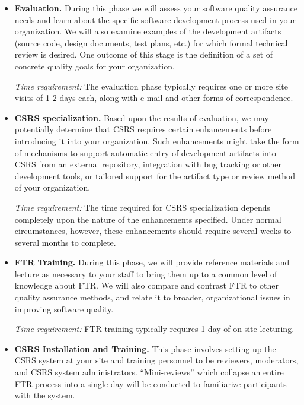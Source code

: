 \begin{itemize}
  
\item {\bf Evaluation.} During this phase we will assess your software
  quality assurance needs and learn about the specific software development
  process used in your organization.  We will also examine examples of the
  development artifacts (source code, design documents, test plans, etc.)
  for which formal technical review is desired.  One outcome of this stage is
  the definition of a set of concrete quality goals for your organization.
  
  {\em Time requirement:} The evaluation phase typically requires one or more
  site visits of 1-2 days each, along with e-mail and other forms of
  correspondence.
  
\item {\bf CSRS specialization.} Based upon the results of evaluation, we
  may potentially determine that CSRS requires certain enhancements before
  introducing it into your organization.  Such enhancements might take the
  form of mechanisms to support automatic entry of development artifacts into
  CSRS from an external repository, integration with bug tracking or other
  development tools, or tailored support for the artifact type or review
  method of your organization.
  
  {\em Time requirement:} The time required for CSRS specialization depends
  completely upon the nature of the enhancements specified.  Under normal
  circumstances, however, these enhancements should require several weeks
  to several months to complete.
  
\item {\bf FTR Training.} During this phase, we will provide reference
  materials and lecture as necessary to your staff to bring them up to a
  common level of knowledge about FTR.  We will also compare and contrast
  FTR to other quality assurance methods, and relate it to broader,
  organizational issues in improving software quality.
  
  {\em Time requirement:} FTR training typically requires 1 day of on-site
  lecturing.
  
\item {\bf CSRS Installation and Training.} This phase involves setting
  up the CSRS system at your site and training personnel to be reviewers,
  moderators, and CSRS system administrators.  ``Mini-reviews'' which
  collapse an entire FTR process into a single day will be conducted to
  familiarize participants with the system.
  

\end{itemize}
